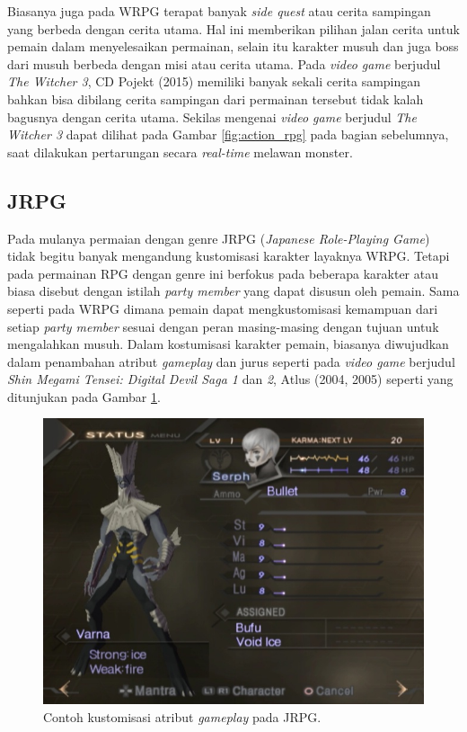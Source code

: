 Biasanya juga pada WRPG terapat banyak \textit{side quest} atau cerita sampingan yang berbeda dengan cerita utama. Hal ini memberikan pilihan jalan cerita untuk pemain dalam menyelesaikan permainan, selain itu karakter musuh dan juga boss dari musuh berbeda dengan misi atau cerita utama. Pada \textit{video game} berjudul \textit{The Witcher 3}, CD Pojekt (2015) memiliki banyak sekali cerita sampingan bahkan bisa dibilang cerita sampingan dari permainan tersebut tidak kalah bagusnya dengan cerita utama. Sekilas mengenai \textit{video game} berjudul \textit{The Witcher 3} dapat dilihat pada Gambar \ref{fig:action_rpg} pada bagian sebelumnya, saat dilakukan pertarungan secara \textit{real-time} melawan monster.
\vspace{1ex}

\subsection{JRPG}
\label{sec:sub_sec2_jrpg}

Pada mulanya permaian dengan genre JRPG (\textit{Japanese Role-Playing Game}) tidak begitu banyak mengandung kustomisasi karakter layaknya WRPG. Tetapi pada permainan RPG dengan genre ini berfokus pada beberapa karakter atau biasa disebut dengan istilah \textit{party member} yang dapat disusun oleh pemain. Sama seperti pada WRPG dimana pemain dapat mengkustomisasi kemampuan dari setiap \textit{party member} sesuai dengan peran masing-masing dengan tujuan untuk mengalahkan musuh. Dalam kostumisasi karakter pemain, biasanya diwujudkan dalam penambahan atribut \textit{gameplay} dan jurus seperti pada \textit{video game} berjudul \textit{Shin Megami Tensei: Digital Devil Saga 1} dan \textit{2}, Atlus (2004, 2005) seperti yang ditunjukan pada Gambar \ref{fig:dds}.
\vspace{1ex}

\begin{figure} [!h] \centering
	\includegraphics[scale=0.48]{img/dds.jpg}
	\caption{Contoh kustomisasi atribut \textit{gameplay} pada JRPG.}
	\label{fig:dds}
\end{figure}

